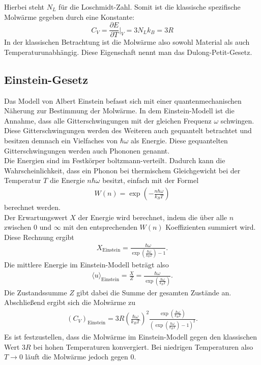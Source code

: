 Hierbei steht $N_L$ für die Loschmidt-Zahl. Somit ist die klassische spezifische Molwärme gegeben durch eine Konstante:
\begin{equation}
    C_V = \frac{\partial E}{\partial T} \bigg\vert_V = 3 N_L k_B = 3 R
\end{equation}
In der klassischen Betrachtung ist die Molwärme also sowohl Material als auch Temperaturunabhängig. Diese Eigenschaft nennt man das Dulong-Petit-Gesetz.
\subsection{Einstein-Gesetz}
\label{sec:einstein}

Das Modell von Albert Einstein befasst sich mit einer quantenmechanischen Näherung zur Bestimmung der Molwärme. In dem Einstein-Modell ist die Annahme, 
dass alle Gitterschwingungen mit der gleichen Frequenz $\omega$ schwingen. Diese Gitterschwingungen werden des Weiteren auch gequantelt betrachtet und besitzen demnach ein 
Vielfaches von $\hbar \omega$ als Energie. Diese gequantelten Gitterschwingungen werden auch Phononen genannt. \\

Die Energien sind im Festkörper boltzmann-verteilt. Dadurch kann die Wahrscheinlichkeit, dass ein Phonon bei thermischem Gleichgewicht bei der Temperatur $T$ die Energie $n \hbar \omega$ besitzt, 
einfach mit der Formel
\begin{align}
    \label{eqn:wn}
    W(n) = \exp{\left( - \frac{n \hbar \omega}{k_B T} \right)}
\end{align}
berechnet werden. \\
Der Erwartungswert $X$ der Energie wird berechnet, indem die über alle $n$ zwischen $0$ und $\infty$ mit den entsprechenden $W(n)$ Koeffizienten summiert wird. 
Diese Rechnung ergibt
\begin{align}
    X_{\text{Einstein}} = \frac{\hbar \omega}{\exp \left( \frac{\hbar \omega}{k_B T}\right) -1} .
\end{align} 
Die mittlere Energie im Einstein-Modell beträgt also 
\begin{align}
    \langle u \rangle_{\text{Einstein}} = \frac{X}{Z} = \frac{\hbar \omega }{\exp \left( \frac{\hbar \omega}{k_B T}\right)}.
\end{align}
Die Zustandssumme $Z$ gibt dabei die Summe der gesamten Zustände an. Abschließend ergibt sich die Molwärme zu 
\begin{align}
    \label{eqn:moleinstein}
    (C_V)_{\text{Einstein}} = 3 R \left( \frac{\hbar \omega}{k_B T}\right)^2 \frac{\exp \left(\frac{\hbar \omega}{k_B T}\right)}{\left(\exp \left(\frac{\hbar \omega}{k_B T}\right) -1 \right)^2}.
\end{align}
Es ist festzustellen, dass die Molwärme im Einstein-Modell gegen den klassischen Wert $3 R$ bei hohen Temperaturen konvergiert. Bei niedrigen Temperaturen also $T \rightarrow 0$ läuft die Molwärme jedoch gegen $0$.
